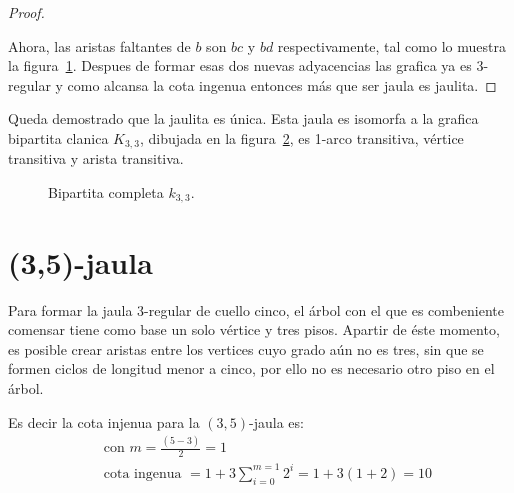 \documentclass[12pt]{book}
\theoremstyle{definition}
\begin{document}
\begin{proof}
\begin{figure}[htb]
  \caption{} \label{jaula(3,4)}
\end{figure}

Ahora, las aristas faltantes de $b$ son  $bc$
y $bd$ respectivamente, tal como lo muestra la
figura~\ref{jaula(3,4)}. Despues de formar esas dos nuevas adyacencias
las grafica ya es 3-regular y como alcansa la cota ingenua entonces
más que ser jaula es
jaulita.
\end{proof}

Queda demostrado que la jaulita es única. Esta jaula es isomorfa a la
grafica bipartita clanica  $K_{3,3}$,
dibujada en la figura~\ref{K_3,3}, es 1-arco transitiva, vértice
transitiva y arista transitiva.

\begin{figure}[htb]
  \centering
  \caption{Bipartita completa $k_{3,3}$.} \label{K_3,3}
\end{figure}


\section{(3,5)-jaula}

Para formar la jaula $3$-regular de cuello cinco, el árbol con el que
es combeniente comensar tiene como base un solo vértice
y tres pisos. Apartir de éste momento, es posible crear aristas entre
los vertices cuyo grado aún no es tres, sin que se formen ciclos de
longitud menor a cinco, por ello no es necesario otro piso en el
árbol. 

Es decir la cota injenua para la $(3,5)$-jaula es: 
\begin{equation*}
\begin{split}
  &\text{ con } m=\frac{(5-3)}{2}=1\\
 &\text{ cota ingenua }= 1 + 3\sum^{m=1}_{i=0} 2^i=1+3(1+2)=10
\end{split}
\end{equation*}
\end{document}
